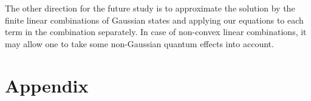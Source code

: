 \documentclass[12pt]{article}
\theoremstyle{definition}
\begin{document}
	The other direction for the future study is to approximate the solution by the finite linear combinations of Gaussian states and applying our equations to each term in the combination separately. In case of non-convex linear combinations, it may allow one to take some non-Gaussian quantum effects into account.
	
	
	
 
 
%	
	
	
	
	
	
	
	
	
	\newpage
	
	
	\section{Appendix\label{App}}
	
	
	
	
\end{document}
